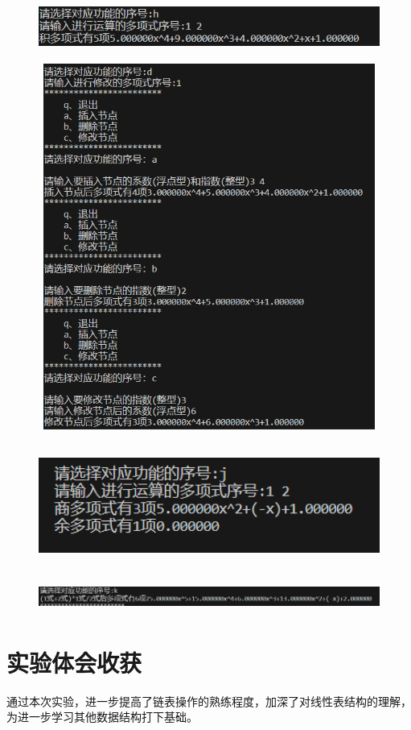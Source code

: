 \documentclass{ctexart}
\begin{document}
		\begin{figure}[H]
		\centering 
		\includegraphics[height=1.5cm,width=12cm]{6.png}
		\end{figure}
		\begin{figure}[H]
		\centering 
		\includegraphics[height=12cm,width=12cm]{3.png}
		\end{figure}
		\begin{figure}[H]
		\centering 
		\includegraphics[height=4cm,width=14cm]{7.png}
		\end{figure}
		\begin{figure}[H]
		\centering 
		\includegraphics[height=1cm,width=14cm]{8.png}
		\end{figure}
	\section{实验体会收获}
		通过本次实验，进一步提高了链表操作的熟练程度，加深了对线性表结构的理解，
		为进一步学习其他数据结构打下基础。
\end{document}
